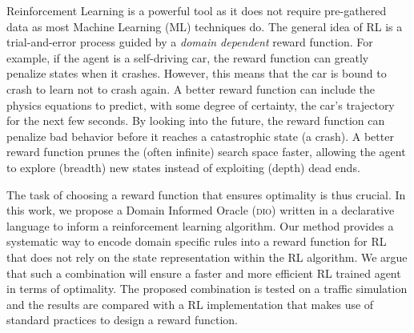 \documentclass[acmsmall]{acmart}
\theoremstyle{definition}
\newcommand{\dio}{\textsc{dio}}
\begin{document}
Reinforcement Learning is a powerful tool as it does not require
pre-gathered data as most Machine Learning (ML) techniques do. 
%
The general idea of RL is a trial-and-error process guided by a
\textit{domain dependent} reward function.
%
For example, if the agent is a self-driving car, the reward function
can greatly penalize states when it crashes.
%
However, this means that the car is bound to crash to learn not to
crash again.
%
A better reward function can include the physics equations to predict,
with some degree of certainty, the car's trajectory for the next few
seconds.
%
By looking into the future, the reward function can penalize bad
behavior before it reaches a catastrophic state (a crash).
%
A better reward function prunes the (often infinite) search space
faster, allowing the agent to explore (breadth) new states instead of
exploiting (depth) dead ends.
%

\medskip

The task of choosing a reward function that ensures optimality is thus
crucial. 
%
In this work, we propose a Domain Informed Oracle (\dio{}) written in a
declarative language to inform a reinforcement learning algorithm. 
%
Our method provides a systematic way to encode domain specific rules
into a reward function for RL that does not rely on the state
representation within the RL algorithm.
%
We argue that such a combination will ensure a faster and more
efficient RL trained agent in terms of optimality. 
%
The proposed combination is tested on a traffic simulation and the
results are compared with a RL implementation that makes use of
standard practices to design a reward function. 






\end{document}
